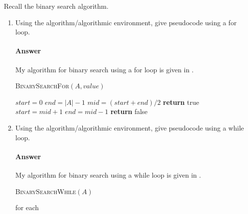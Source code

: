\documentclass{article}
\begin{document}
 

Recall the binary search algorithm.

\begin{enumerate}
    \item Using the algorithm/algorithmic environment,
        give pseudocode using a for loop.

        \paragraph{Answer} My algorithm for binary search using a for loop is given in .

        \begin{algorithm}
            \caption{\textsc{BinarySearchFor}$(A, value)$}\label{alg:forloop}
            \begin{algorithmic}
            \State $start = 0$
            \State$ end = |A|-1$
                	\State $mid = (start + end) / 2$
            			\State \textbf{return} true
					\State $start = mid + 1$
				\Else{}
					\State $end = mid-1$
      			\EndIf
                \EndFor
                \State \textbf{return} false
            \end{algorithmic}
        \end{algorithm}

    \item Using the algorithm/algorithmic environment, give pseudocode using a while loop.

        \paragraph{Answer} My algorithm for binary search using a while loop is given in .

         \begin{algorithm}
            \caption{\textsc{BinarySearchWhile}$(A)$}\label{alg:whileloop}
            \begin{algorithmic}
                \State for each
                

\end{algorithmic}
\end{algorithm}
\end{enumerate}
\end{document}
